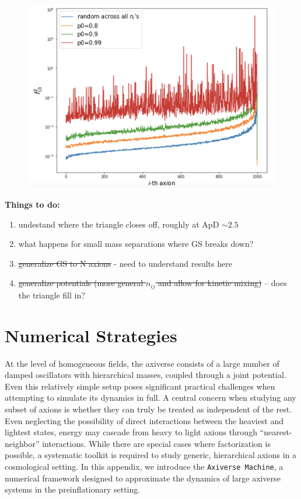\documentclass[11pt]{article}
\begin{document}
\begin{figure}[h]
    \centering
    \includegraphics[width=0.7\linewidth]{figs/different-potential-dists.png}
    \caption{}
    \label{fig:f-with-sparse-n}
\end{figure}

\pagebreak

\color{red}\noindent \textbf{Things to do:}
\begin{enumerate}
    \item undestand where the triangle closes off, roughly at ApD $\sim 2.5$
    \item what happens for small mass separations where GS breaks down?
    \item \st{generalize GS to N axions} - need to understand results here
    \item \st{generalize potentials (more general $n_{ij}$ and allow for kinetic mixing) }– does the triangle fill in?
\end{enumerate}\color{black}

\appendix
\section{Numerical Strategies}

At the level of homogeneous fields, the axiverse consists of a large number of damped oscillators with hierarchical masses, coupled through a joint potential. Even this relatively simple setup poses significant practical challenges when attempting to simulate its dynamics in full. A central concern when studying any subset of axions is whether they can truly be treated as independent of the rest. Even neglecting the possibility of direct interactions between the heaviest and lightest states, energy may cascade from heavy to light axions through ``nearest-neighbor'' interactions. While there are special cases where factorization is possible, a systematic toolkit is required to study generic, hierarchical axions in a cosmological setting. In this appendix, we introduce the \texttt{Axiverse Machine}, a numerical framework designed to approximate the dynamics of large axiverse systems in the preinflationary setting. 
\end{document}
